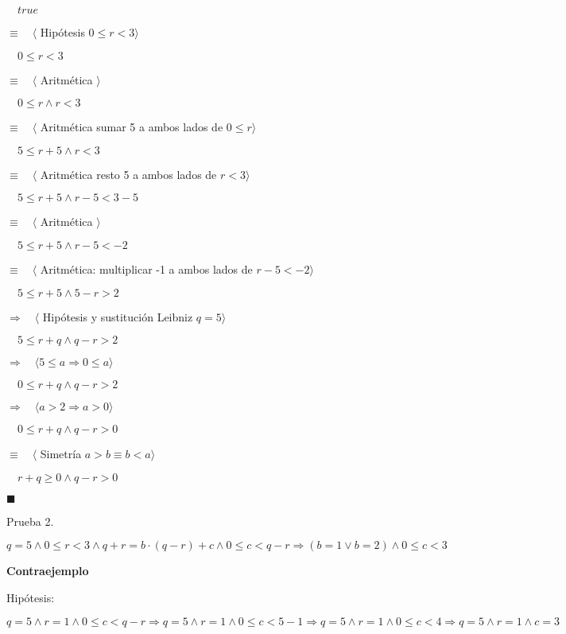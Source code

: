 \documentclass[hidelinks]{article}
\begin{document}
$\quad true$ \par
$\equiv \quad \langle$ Hipótesis $ 0 \leq r < 3 \rangle$ \par
$\quad 0 \leq r < 3$ \par
$\equiv \quad \langle$ Aritmética $ \rangle$ \par
$\quad 0 \leq r \land r < 3$ \par
$\equiv \quad \langle$ Aritmética sumar 5 a ambos lados de $ 0 \leq r \rangle$ \par
$\quad 5 \leq r +5 \land r < 3$ \par
$\equiv \quad \langle$ Aritmética resto 5 a ambos lados de $ r < 3 \rangle$ \par
$\quad 5 \leq r +5 \land r - 5 < 3 - 5$ \par
$\equiv \quad \langle$ Aritmética $ \rangle$ \par
$\quad 5 \leq r +5 \land r - 5 < -2$ \par
$\equiv \quad \langle$ Aritmética: multiplicar -1 a ambos lados de $r - 5 < -2 \rangle$ \par
$\quad 5 \leq r +5 \land 5 - r > 2$ \par
$\Rightarrow \quad \langle$ Hipótesis y sustitución Leibniz $ q = 5 \rangle$ \par
$\quad 5 \leq r + q \land q - r > 2$ \par
$\Rightarrow \quad \langle 5 \leq a \Rightarrow 0 \leq a \rangle$ \par
$\quad 0 \leq r + q \land q - r > 2$ \par
$\Rightarrow \quad \langle a > 2 \Rightarrow a > 0 \rangle$ \par
$\quad 0 \leq r + q \land q - r > 0$ \par
$\equiv \quad \langle$ Simetría $ a > b \equiv b < a \rangle$ \par
$\quad r + q \geq 0 \land q - r > 0$ \par

$\blacksquare$ \par

Prueba 2. \par

$q=5 \land 0 \leq r < 3 \land q + r = b \cdot (q - r) + c \land 0 \leq c < q - r \Rightarrow (b = 1 \lor b = 2) \land 0 \leq c < 3$ \par

\textbf{Contraejemplo} \par

Hipótesis: \par
$q=5 \land r=1 \land 0 \leq c < q-r \Rightarrow q=5 \land r=1 \land 0 \leq c < 5-1 \Rightarrow q=5 \land r=1 \land 0 \leq c < 4 \Rightarrow q=5 \land r=1 \land c=3$ \par
\end{document}
